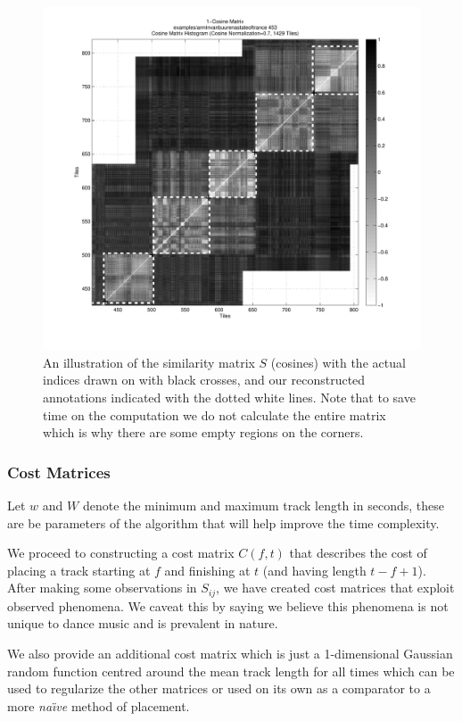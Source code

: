 \documentclass[twocolumn]{article}
\begin{document}
	\begin{figure}[t]
		\centering
		\includegraphics[width=1.08\textwidth]{images/cosines}
		\caption{An illustration of the similarity matrix $S$ (cosines) with the actual indices drawn on with black crosses, and our reconstructed annotations indicated with the dotted white lines. Note that to save time on the computation we do not calculate the entire matrix which is why there are some empty regions on the corners.}
		\label{fig:simmatrix}
	\end{figure} 
	
	\subsubsection{Cost Matrices}\label{sec:cost-matrices}
	
	Let $w$ and $W$ denote the minimum and maximum track length in seconds, these are be parameters of the algorithm that will help improve the time complexity. 
	
We proceed to constructing a cost matrix $C(f,t)$ that describes the
cost of placing a track starting at $f$ and finishing at $t$ (and
having length $t-f+1$). After making some observations in $S_{ij}$, we have created
cost matrices that exploit observed phenomena. We caveat this by saying we believe this phenomena is not
unique to dance music and is prevalent in nature.  

We also
provide an additional cost matrix which is just a 1-dimensional Gaussian random
function centred around the mean track length for all times which can
be used to regularize the other matrices or used on its own as a
comparator to a more \textit{na\"{\i}ve} method of placement.
	
\end{document}
